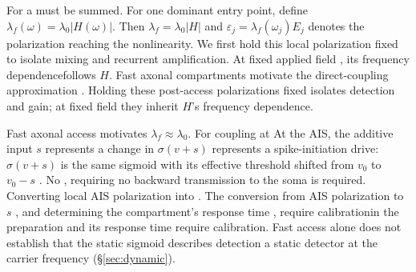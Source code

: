 \documentclass[11pt,a4paper]{article}
\newcommand{\Sig}{\sigma}
\providecommand{\DIFaddtex}[1]{{\protect\color{blue} \sf #1}} %
\providecommand{\DIFdeltex}[1]{{\protect\color{red} \scriptsize #1}} %
\providecommand{\DIFaddbegin}{} %
\providecommand{\DIFaddend}{} %
\providecommand{\DIFdelbegin}{} %
\providecommand{\DIFdelend}{} %
\providecommand{\DIFadd}[1]{\texorpdfstring{\DIFaddtex{#1}}{#1}} %
\providecommand{\DIFdel}[1]{\texorpdfstring{\DIFdeltex{#1}}{}} %
\begin{document}
\DIFdel{For a }\DIFdelend \DIFaddbegin \DIFadd{must be summed. For one }\DIFaddend dominant entry point,
\DIFdelbegin \DIFdel{define $\lambda_f(\omega)=\lambda_0|H(\omega)|$.
Then }\DIFdelend \DIFaddbegin \DIFadd{$\lambda_f=\lambda_0|H|$ and }\DIFaddend $\varepsilon_j=\lambda_f(\omega_j)E_j$\DIFdelbegin \DIFdel{denotes the
polarization reaching the nonlinearity.
We first hold this local polarization fixed to isolate mixing and recurrent
amplification. At fixed applied field , its frequency dependencefollows $H$.
Fast axonal compartments motivate the direct-coupling approximation
}\DIFdelend \DIFaddbegin \DIFadd{.
Holding these post-access polarizations fixed isolates detection and gain;
at fixed field they inherit $H$'s frequency dependence.
}

\DIFadd{Fast axonal access motivates }\DIFaddend $\lambda_f\approx\lambda_0$. \DIFdelbegin \DIFdel{For coupling at }\DIFdelend \DIFaddbegin \DIFadd{At }\DIFaddend the AIS,
\DIFdelbegin \DIFdel{the additive input $s$
represents a change in }\DIFdelend \DIFaddbegin \DIFadd{$\Sig(v+s)$ represents a }\DIFaddend spike-initiation \DIFdelbegin \DIFdel{drive: $\Sig(v+s)$ is the same
sigmoid with its effective }\DIFdelend threshold shifted from $v_0$ to
$v_0-s$\DIFdelbegin \DIFdel{.
No }\DIFdelend \DIFaddbegin \DIFadd{, requiring no }\DIFaddend backward transmission to the soma\DIFdelbegin \DIFdel{is required. Converting local AIS polarization into }\DIFdelend \DIFaddbegin \DIFadd{. The conversion from
AIS polarization to }\DIFaddend $s$ \DIFdelbegin \DIFdel{, and determining the compartment's response time ,
require calibrationin the preparation}\DIFdelend \DIFaddbegin \DIFadd{and its response time require calibration}\DIFaddend . Fast
access alone does not establish \DIFdelbegin \DIFdel{that the static sigmoid describes detection }\DIFdelend \DIFaddbegin \DIFadd{a static detector }\DIFaddend at the carrier frequency
\DIFaddbegin \DIFadd{(\S\ref{sec:dynamic})}\DIFaddend .
\end{document}
